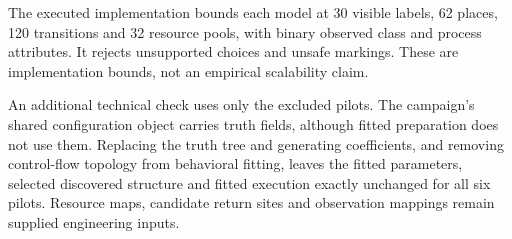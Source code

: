 The executed implementation bounds each model at 30 visible labels, 62 places, 120 transitions and 32 resource pools, with binary observed class and process attributes. It rejects unsupported choices and unsafe markings. These are implementation bounds, not an empirical scalability claim.

An additional technical check uses only the excluded pilots. The campaign's shared configuration object carries truth fields, although fitted preparation does not use them. Replacing the truth tree and generating coefficients, and removing control-flow topology from behavioral fitting, leaves the fitted parameters, selected discovered structure and fitted execution exactly unchanged for all six pilots. Resource maps, candidate return sites and observation mappings remain supplied engineering inputs.
